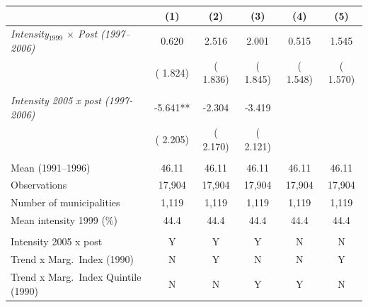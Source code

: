\begin{tabular}{lccccc} \hline \hline
& \multicolumn{1}{c}{(1)} & \multicolumn{1}{c}{(2)} & \multicolumn{1}{c}{(3)} & \multicolumn{1}{c}{(4)} & \multicolumn{1}{c}{(5)} \\ \toprule
\textit{Intensity$_{1999}$ $\times$ Post (1997--2006)} &        0.620 &        2.516 &        2.001 &        0.515 &        1.545 \\ 
 & (       1.824) & (       1.836) & (       1.845) & (       1.548) & (       1.570) \\ 
  & & & & & \\ 
\textit{Intensity 2005 x post (1997-2006)} &       -5.641** &       -2.304 &       -3.419 & & \\ 
 & (       2.205) & (       2.170) & (       2.121) & & \\ 
  & & & & & \\ 
Mean (1991--1996) &        46.11 &        46.11 &        46.11 &        46.11 &        46.11 \\ 
Observations &       17,904 &       17,904 &       17,904 &       17,904 &       17,904 \\ 
Number of municipalities &        1,119 &        1,119 &        1,119 &        1,119 &        1,119 \\ 
Mean intensity 1999 (\%) &   44.4 &   44.4 &   44.4 &   44.4 &   44.4 \\ 
  & & & & & \\ 
Intensity 2005 x post & Y & Y & Y & N & N \\ Trend x Marg.\ Index (1990) & N & Y & N & N & Y \\ Trend x Marg.\ Index Quintile (1990) & N & N & Y & Y & N \\ 
\bottomrule
\end{tabular}